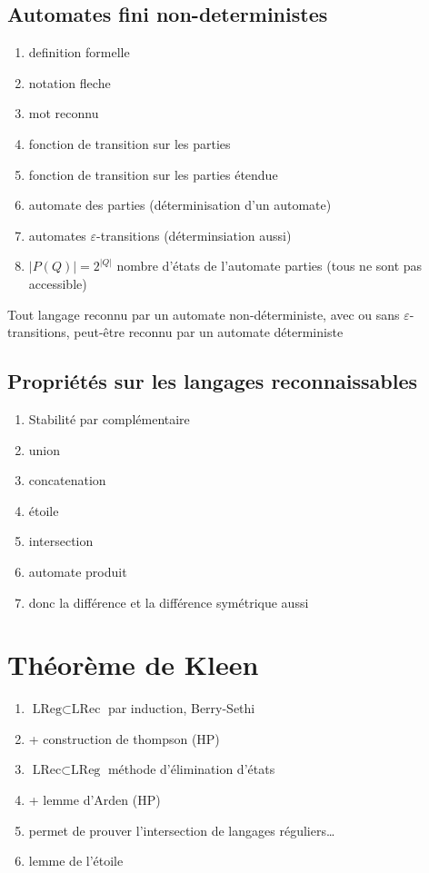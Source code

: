 \subsection{Automates fini non-deterministes}

\begin{enumerate}
    \item definition formelle
    \item notation fleche
    \item mot reconnu
    \item fonction de transition sur les parties
    \item fonction de transition sur les parties étendue
    \item automate des parties (déterminisation d'un automate)
    \item automates $\varepsilon$-transitions (déterminsiation aussi)
    \item $|P(Q)| = 2^{|Q|}$ nombre d'états de l'automate parties (tous ne sont pas accessible)
\end{enumerate}

\begin{proposition}{}{}
    Tout langage reconnu par un automate non-déterministe, avec ou sans $\varepsilon$-transitions,
    peut-être reconnu par un automate déterministe
\end{proposition}

\subsection{Propriétés sur les langages reconnaissables}
\begin{enumerate}
    \item Stabilité par complémentaire
    \item union
    \item concatenation
    \item étoile
    \item intersection
    \item automate produit
    \item donc la différence et la différence symétrique aussi
\end{enumerate}

\section{Théorème de Kleen}

\begin{enumerate}
    \item $\text{LReg} \subset \text{LRec}$ par induction, Berry-Sethi
    \item + construction de thompson (HP)
    \item $\text{LRec} \subset \text{LReg}$ méthode d'élimination d'états
    \item + lemme d'Arden (HP)
    \item permet de prouver l'intersection de langages réguliers\dots
    \item lemme de l'étoile 
\end{enumerate}